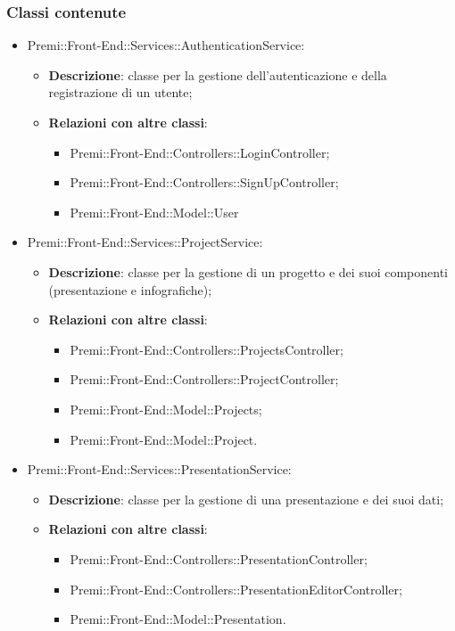 \subsubsection{Classi contenute}
\begin{itemize}

    \item Premi::Front-End::Services::AuthenticationService:
	\begin{itemize}
		\item \textbf{Descrizione}: classe per la gestione dell'autenticazione e della registrazione di un utente;
		\item \textbf{Relazioni con altre classi}:
		\begin{itemize}
			\item Premi::Front-End::Controllers::LoginController;
			\item Premi::Front-End::Controllers::SignUpController;
			\item Premi::Front-End::Model::User
		\end{itemize}
	\end{itemize}

    \item Premi::Front-End::Services::ProjectService:
	\begin{itemize}
		\item \textbf{Descrizione}: classe per la gestione di un progetto e dei suoi componenti (presentazione e infografiche);
		\item \textbf{Relazioni con altre classi}:
		\begin{itemize}
			\item Premi::Front-End::Controllers::ProjectsController;
			\item Premi::Front-End::Controllers::ProjectController;
			\item Premi::Front-End::Model::Projects;
			\item Premi::Front-End::Model::Project.
		\end{itemize}
	\end{itemize}

    \item Premi::Front-End::Services::PresentationService:
	\begin{itemize}
		\item \textbf{Descrizione}: classe per la gestione di una presentazione e dei suoi dati;
		\item \textbf{Relazioni con altre classi}:
		\begin{itemize}
			\item Premi::Front-End::Controllers::PresentationController;
			\item Premi::Front-End::Controllers::PresentationEditorController;
			\item Premi::Front-End::Model::Presentation.
		\end{itemize}
	\end{itemize}


\end{itemize}
